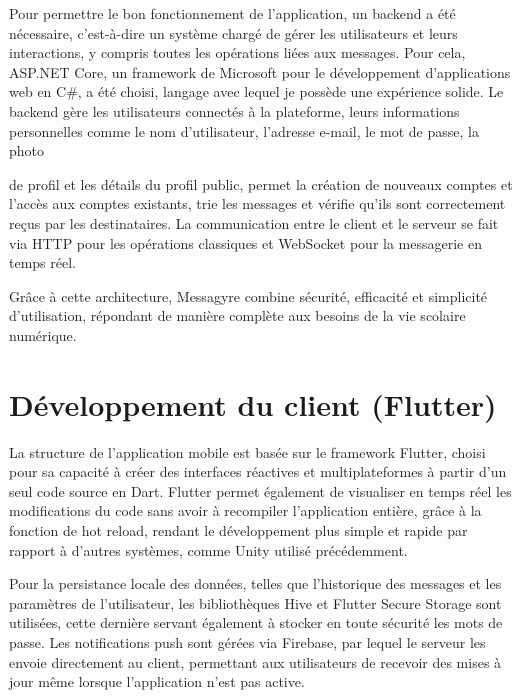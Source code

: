 \documentclass[12pt]{report}
\begin{document}
	Pour permettre le bon fonctionnement de l’application, un backend a été nécessaire, c’est-à-dire un système chargé de gérer les utilisateurs et leurs interactions, y compris toutes les opérations liées aux messages. Pour cela, ASP.NET Core\supercite{aspnetcore}, un framework de Microsoft pour le développement d’applications web en C\#\supercite{csharp}, a été choisi, langage avec lequel je possède une expérience solide. Le backend gère les utilisateurs connectés à la plateforme, leurs informations personnelles comme le nom d’utilisateur, l’adresse e-mail, le mot de passe, la photo 
	
	de profil et les détails du profil public, permet la création de nouveaux comptes et l’accès aux comptes existants, trie les messages et vérifie qu’ils sont correctement reçus par les destinataires. La communication entre le client et le serveur se fait via HTTP\supercite{http} pour les opérations classiques et WebSocket\supercite{websocket} pour la messagerie en temps réel.
	
	Grâce à cette architecture, Messagyre combine sécurité, efficacité et simplicité d’utilisation, répondant de manière complète aux besoins de la vie scolaire numérique.
	
	\section{Développement du client (Flutter)}
	
	La structure de l'application mobile est basée sur le framework Flutter\supercite{flutter}, choisi pour sa capacité à créer des interfaces réactives et multiplateformes à partir d'un seul code source en Dart\supercite{dart}. Flutter permet également de visualiser en temps réel les modifications du code sans avoir à recompiler l'application entière, grâce à la fonction de hot reload, rendant le développement plus simple et rapide par rapport à d'autres systèmes, comme Unity utilisé précédemment.
	
	Pour la persistance locale des données, telles que l'historique des messages et les paramètres de l'utilisateur, les bibliothèques Hive\supercite{hive} et Flutter Secure Storage\supercite{securestorage} sont utilisées, cette dernière servant également à stocker en toute sécurité les mots de passe. Les notifications push sont gérées via Firebase\supercite{firebase}, par lequel le serveur les envoie directement au client, permettant aux utilisateurs de recevoir des mises à jour même lorsque l'application n'est pas active.
	
\end{document}
